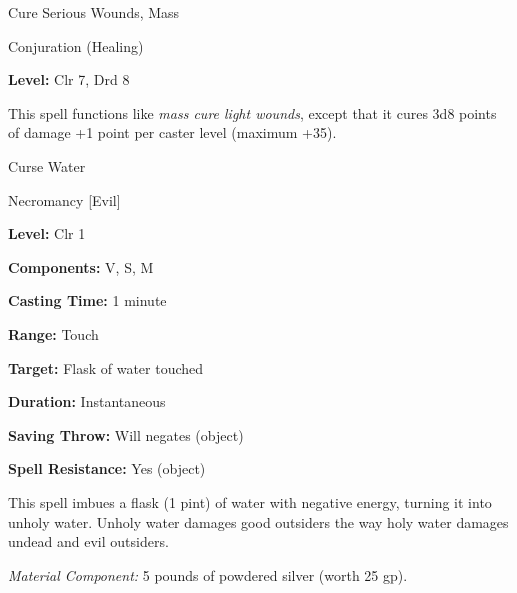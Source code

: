 \documentclass{article}
\begin{document}
\vspace{12pt}
Cure Serious Wounds, Mass

Conjuration (Healing)

\textbf{Level:} Clr 7, Drd 8

This spell functions like \textit{mass cure light wounds}, except that it cures 
3d8 points of damage +1 point per caster level (maximum +35).

\vspace{12pt}
Curse Water

Necromancy [Evil]

\textbf{Level:} Clr 1

\textbf{Components:} V, S, M

\textbf{Casting Time:} 1 minute

\textbf{Range:} Touch

\textbf{Target:} Flask of water touched

\textbf{Duration:} Instantaneous

\textbf{Saving Throw: }Will negates (object)

\textbf{Spell Resistance:} Yes (object)

This spell imbues a flask (1 pint) of water with negative energy, turning it into 
unholy water. Unholy water damages good outsiders the way holy water damages undead 
and evil outsiders.

\textit{Material Component: }5 pounds of powdered silver (worth 25 gp).

\newpage
\end{document}
